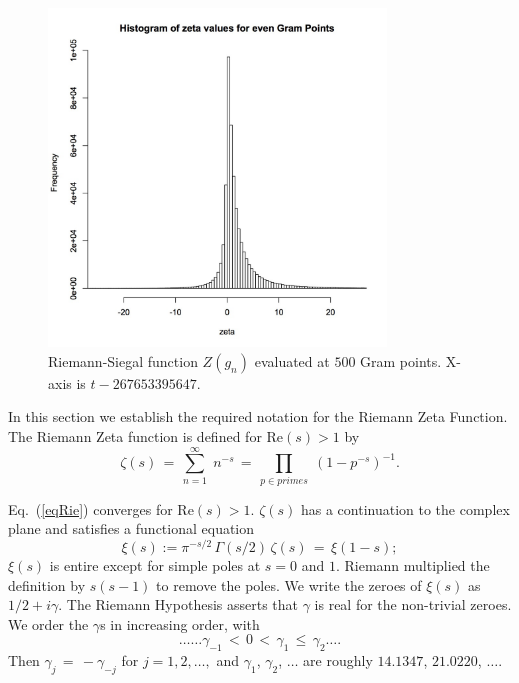 \documentclass[12pt]{article}
\begin{document}
\begin{figure}
\centering
\includegraphics[width=0.8\textwidth]{ezeta.jpg}
\caption[]{ 
 Riemann-Siegal function $Z(g_n)$ evaluated at $500$ Gram points.
 X-axis is $t-267653395647$.}
\label{ZGram}
\end{figure}


In this section we  establish the required notation for the 
Riemann Zeta Function. 
The Riemann Zeta function is defined for $\mathrm{Re} (s) > 1$ by
\begin{equation}
\zeta ( s ) \, = \, \sum^{\infty}_{n = 1} \; n^{-s} \, = \, \prod_{p \in primes} \;
\left( 1 - p^{-s} \right)^{-1}.
\label{eqRie}
\end{equation}

Eq.~(\ref{eqRie})  converges for $\mathrm{Re} (s) > 1$.  
 $\zeta ( s )$ has a  continuation
to the complex plane and satisfies a functional equation \cite{Riemann(1858),Riemann(1892),Titchmarsh(1986),Edwards(1974)}
\begin{equation}  
\xi(s):= \pi^{-s/2} \, \Gamma (s/2) \, \zeta ( s ) \, = \, \xi ( 1 - s );
\label{eq:func}
\end{equation}
$\xi(s)$ is entire except for simple poles at $s = 0$ and $1$. Riemann
multiplied the definition by $s(s-1)$ to remove the poles. We
write the zeroes of $\xi(s)$ as $1/2 + i \gamma$. The Riemann Hypothesis  
asserts that $\gamma$ is real for the non-trivial zeroes.
We order the $\gamma$s in increasing order, with 
\begin{equation}
\ldots \ldots \gamma_{-1} \, < \, 0 \, < \, 
\gamma_1 \, \leq \, \gamma_2 \ldots. 
\end{equation}
Then $\gamma_j \, = \, - \gamma_{-j}$ for $j = 1, 2, \ldots,$ 
and    $\gamma_1$, $\gamma_2$, $\ldots$  are roughly
$14.1347$, $21.0220$, $\ldots$.
\end{document}
